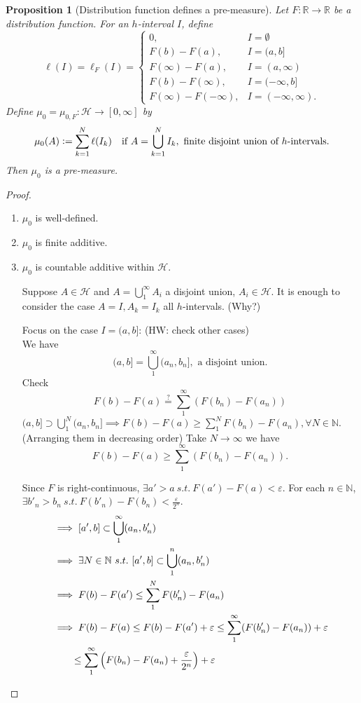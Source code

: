 \documentclass{report}
\newcommand{\R}{\mathbb{R}}
\newcommand{\N}{\mathbb{N}}
\newcommand{\st}{\ s.t.\ }
\newcommand{\defeq}{\vcentcolon=}
\newtheorem{proposition}[theorem]{Proposition}
\theoremstyle{definition}
\theoremstyle{remark}
\begin{document}
\begin{proposition}[Distribution function defines a pre-measure]
Let $F: \R \to \R$ be a distribution function. For an $h$-interval $I$, define
\[
\ell(I) = \ell_F(I) = \begin{cases}
0,  & I = \emptyset \\
F(b) - F(a), & I = (a, b] \\
F(\infty) - F(a), & I = (a, \infty) \\
F(b) - F(\infty), & I = (-\infty, b] \\
F(\infty) - F(-\infty), & I = (-\infty, \infty). 
\end{cases}
\]
Define $\mu_0 = \mu_{0, F}: \mathcal{H} \to [0, \infty]$ by
\[
\mu_0(A) \defeq \sum_{k=1}^N \ell(I_k) \quad \text{if } A = \bigcup_{k=1}^N I_k, \text{ finite disjoint union of $h$-intervals.}
\]
Then $\mu_0$ is a pre-measure.
\end{proposition}
\begin{proof}
\begin{enumerate}
\item $\mu_0$ is well-defined.
\item $\mu_0$ is finite additive.
\item $\mu_0$ is countable additive within $\mathcal{H}$.

Suppose $A \in \mathcal{H}$ and $A = \bigcup_1^\infty A_i$ a disjoint union, $A_i \in \mathcal{H}$. It is enough to consider the case $A = I, A_k = I_k$ all $h$-intervals. (Why?)

Focus on the case $I = (a, b]$: (HW: check other cases)\\
We have
\[(a, b] = \bigcup_1^\infty(a_n, b_n], \text{ a disjoint union}.\]
Check
\[F(b) - F(a) \stackrel{\text{?}}{=} \sum_1^\infty(F(b_n) - F(a_n))\]
$(a, b] \supset \bigcup_1^N (a_n, b_n] \implies F(b) - F(a) \geq \sum_1^N F(b_n) - F(a_n), \forall N \in \N$. (Arranging them in decreasing order) Take $N \to \infty$ we have
\[F(b) - F(a) \geq \sum_1^\infty(F(b_n) - F(a_n)).\]

Since $F$ is right-continuous, $\exists a' > a \st F(a') - F(a) < \varepsilon$.
For each $n \in \N$, $\exists b'_n > b_n \st F(b'_n) - F(b_n) < \frac{\varepsilon}{2^n}$. 
\begin{align*}
& \implies [a', b] \subset \bigcup_1^\infty(a_n, b'_n) \\
& \implies \exists N \in \N \st [a', b] \subset \bigcup_1^n (a_n, b'_n)\\
& \implies F(b) - F(a') \leq \sum_1^N F(b'_n) - F(a_n) \\
& \implies F(b) - F(a) \leq F(b) - F(a') + \varepsilon \leq \sum_1^\infty(F(b'_n)-F(a_n)) + \varepsilon \\
& \quad \quad \leq \sum_1^\infty\left(F(b_n)-F(a_n) + \frac{\varepsilon}{2^n}\right) + \varepsilon \qedhere
\end{align*}
\end{enumerate}
\end{proof}
\end{document}

